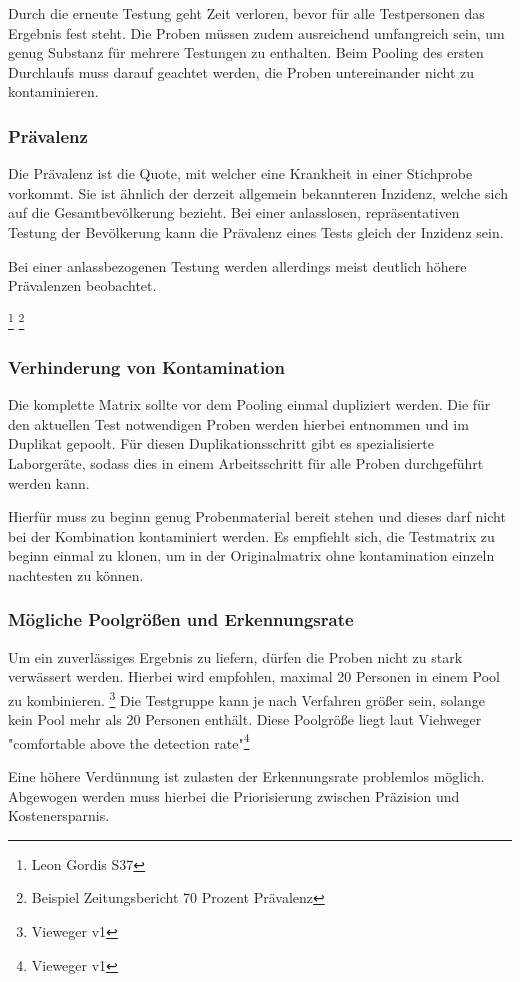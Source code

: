 Durch die erneute Testung geht Zeit verloren, bevor für alle Testpersonen das Ergebnis fest steht.
Die Proben müssen zudem ausreichend umfangreich sein, um genug Substanz für mehrere Testungen zu enthalten.
Beim Pooling des ersten Durchlaufs muss darauf geachtet werden, die Proben untereinander nicht zu kontaminieren.

\subsubsection{Prävalenz}
Die Prävalenz ist die Quote, mit welcher eine Krankheit in einer Stichprobe vorkommt.
Sie ist ähnlich der derzeit allgemein bekannteren Inzidenz, welche sich auf die Gesamtbevölkerung bezieht.
Bei einer anlasslosen, repräsentativen Testung der Bevölkerung kann die Prävalenz eines Tests gleich der Inzidenz sein.

Bei einer anlassbezogenen Testung werden allerdings meist deutlich höhere Prävalenzen beobachtet.

\footnote{Leon Gordis S37}
\footnote{Beispiel Zeitungsbericht 70 Prozent Prävalenz}


\subsubsection{Verhinderung von Kontamination}
Die komplette Matrix sollte vor dem Pooling einmal dupliziert werden. 
Die für den aktuellen Test notwendigen Proben werden hierbei entnommen und im Duplikat gepoolt.
Für diesen Duplikationsschritt gibt es spezialisierte Laborgeräte, sodass dies in einem Arbeitsschritt für alle Proben durchgeführt werden kann.

Hierfür muss zu beginn genug Probenmaterial bereit stehen und dieses darf nicht bei der Kombination kontaminiert werden.
Es empfiehlt sich, die Testmatrix zu beginn einmal zu klonen, um in der Originalmatrix ohne kontamination einzeln nachtesten zu können.

\subsubsection{Mögliche Poolgrößen und Erkennungsrate}
Um ein zuverlässiges Ergebnis zu liefern, dürfen die Proben nicht zu stark verwässert werden.
Hierbei wird empfohlen, maximal 20 Personen in einem Pool zu kombinieren. \footnote{Vieweger v1}
Die Testgruppe kann je nach Verfahren größer sein, solange kein Pool mehr als 20 Personen enthält.
Diese Poolgröße liegt laut Viehweger "comfortable above the detection rate"\footnote{Vieweger v1}

Eine höhere Verdünnung ist zulasten der Erkennungsrate problemlos möglich.
Abgewogen werden muss hierbei die Priorisierung zwischen Präzision und Kostenersparnis.



